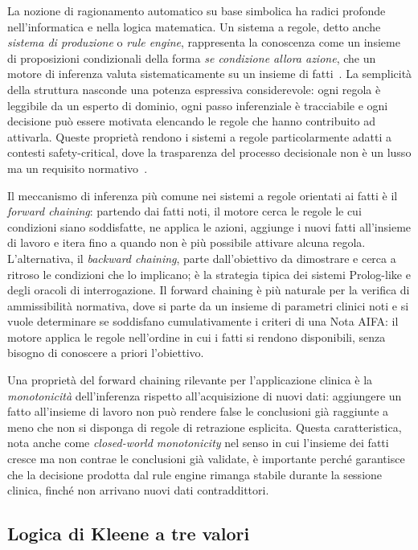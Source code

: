 La nozione di ragionamento automatico su base simbolica ha radici profonde
nell'informatica e nella logica matematica. Un sistema a regole, detto
anche \emph{sistema di produzione} o \emph{rule engine}, rappresenta la
conoscenza come un insieme di proposizioni condizionali della forma
\textit{se condizione allora azione}, che un motore di inferenza valuta
sistematicamente su un insieme di fatti~\cite{hripcsak1994arden}. La
semplicità della struttura nasconde una potenza espressiva considerevole: ogni
regola è leggibile da un esperto di dominio, ogni passo inferenziale è
tracciabile e ogni decisione può essere motivata elencando le regole che
hanno contribuito ad attivarla. Queste proprietà rendono i sistemi a regole
particolarmente adatti a contesti safety-critical, dove la trasparenza del
processo decisionale non è un lusso ma un requisito
normativo~\cite{greenes2007cdss}.

Il meccanismo di inferenza più comune nei sistemi a regole orientati ai fatti
è il \emph{forward chaining}: partendo dai fatti noti, il motore cerca le
regole le cui condizioni siano soddisfatte, ne applica le azioni, aggiunge i
nuovi fatti all'insieme di lavoro e itera fino a quando non è più possibile
attivare alcuna regola. L'alternativa, il \emph{backward chaining}, parte
dall'obiettivo da dimostrare e cerca a ritroso le condizioni che lo
implicano; è la strategia tipica dei sistemi Prolog-like e degli oracoli
di interrogazione. Il forward chaining è più naturale per la verifica di
ammissibilità normativa, dove si parte da un insieme di parametri clinici
noti e si vuole determinare se soddisfano cumulativamente i criteri di una
Nota AIFA: il motore applica le regole nell'ordine in cui i fatti
si rendono disponibili, senza bisogno di conoscere a priori l'obiettivo.

Una proprietà del forward chaining rilevante per l'applicazione clinica è
la \emph{monotonicità} dell'inferenza rispetto all'acquisizione di nuovi
dati: aggiungere un fatto all'insieme di lavoro non può rendere false le
conclusioni già raggiunte a meno che non si disponga di regole di
retrazione esplicita. Questa caratteristica, nota anche come \emph{closed-world
monotonicity} nel senso in cui l'insieme dei fatti cresce ma non contrae
le conclusioni già validate, è importante perché garantisce che la
decisione prodotta dal rule engine rimanga stabile durante la sessione
clinica, finché non arrivano nuovi dati contraddittori.

\subsection{Logica di Kleene a tre valori}
\label{subsec:kleene}

